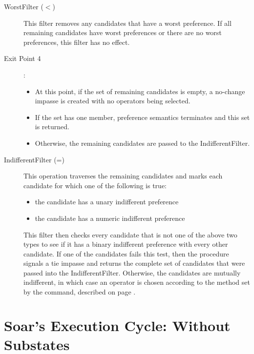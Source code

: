 \begin{description}
	\item[WorstFilter ($<$) ] This filter removes any candidates that have a worst preference. If all remaining candidates have worst preferences or there are no worst preferences, this filter has no effect.
	
	\item[Exit Point 4]:
	\begin{itemize}
		\item At this point, if the set of remaining candidates is empty, a no-change impasse is created with no operators being selected. 
		\item If the set has one member, preference semantics terminates and this set is returned.
		\item Otherwise, the remaining candidates are passed to the IndifferentFilter.
	\end{itemize}
	
	\item[IndifferentFilter (=) ] This operation traverses the remaining candidates and marks each candidate for which one of the following is true:
	\begin{itemize}
		\item the candidate has a unary indifferent preference
		\item the candidate has a numeric indifferent preference
	\end{itemize}
	This filter then checks every candidate that is not one of the above two types to see if it has a binary indifferent preference with every other candidate. If one of the candidates fails this test, then the procedure signals a tie impasse and returns the complete set of candidates that were passed into the IndifferentFilter. Otherwise, the candidates are mutually indifferent, in which case an operator is chosen according to the method set by the  command, described on page \pageref{decide-indifferent-selection}.
\end{description}

\section{Soar's Execution Cycle: Without Substates}
\label{ARCH-decision}


